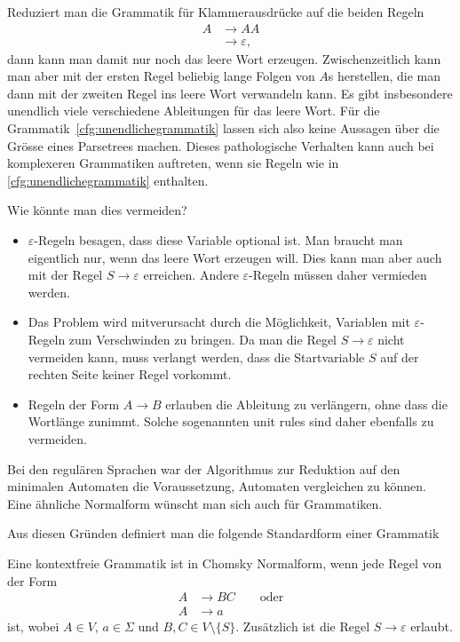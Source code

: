 Reduziert man die Grammatik für Klammerausdrücke auf die beiden Regeln
\begin{equation}
\begin{aligned}
A&\to AA
\\
 &\to\varepsilon,
\end{aligned}
\label{cfg:unendlichegrammatik}
\end{equation}
dann kann man damit nur noch das leere Wort erzeugen.
Zwischenzeitlich kann man aber mit der ersten Regel beliebig lange 
Folgen von $A$s herstellen, die man dann mit der zweiten Regel ins
leere Wort verwandeln kann.
Es gibt insbesondere unendlich viele verschiedene Ableitungen für
das leere Wort.
Für die Grammatik~\eqref{cfg:unendlichegrammatik} lassen sich also
keine Aussagen über die Grösse eines Parsetrees machen.
Dieses pathologische Verhalten kann auch bei komplexeren Grammatiken
auftreten, wenn sie Regeln wie in \eqref{cfg:unendlichegrammatik}
enthalten.

Wie könnte man dies vermeiden? 
\begin{itemize}
\item
$\varepsilon$-Regeln besagen, dass diese Variable optional ist.
Man braucht man eigentlich nur, wenn das leere Wort erzeugen will.
Dies kann man aber auch mit der Regel $S\to\varepsilon$ erreichen.
Andere $\varepsilon$-Regeln müssen daher vermieden werden.
\item
Das Problem wird mitverursacht durch die Möglichkeit, Variablen mit 
$\varepsilon$-Regeln zum Verschwinden zu bringen.
Da man die Regel $S\to\varepsilon$ nicht vermeiden kann, muss verlangt
werden, dass die Startvariable $S$ auf der rechten Seite keiner Regel
vorkommt.
\item
Regeln der Form $A\to B$ erlauben die Ableitung zu verlängern, ohne
dass die Wortlänge zunimmt.
Solche sogenannten unit rules sind daher ebenfalls zu vermeiden.
\end{itemize}

Bei den regulären Sprachen war der Algorithmus zur Reduktion
auf den minimalen Automaten die Voraussetzung, Automaten vergleichen
zu können. Eine ähnliche Normalform wünscht man sich auch für
Grammatiken.

Aus diesen Gründen definiert man die folgende Standardform einer Grammatik
\begin{definition}
\label{definition:cnf}
%
Eine kontextfreie Grammatik  ist in Chomsky Normalform, wenn
jede Regel von der Form
\begin{align*}
A&\to BC\qquad\text{oder}\\
A&\to a
\end{align*}
ist, wobei $A\in V$, $a\in\Sigma$ und $B, C\in V\setminus\{S\}$.
Zusätzlich ist die Regel $S\to\varepsilon$ erlaubt. 
\end{definition}

